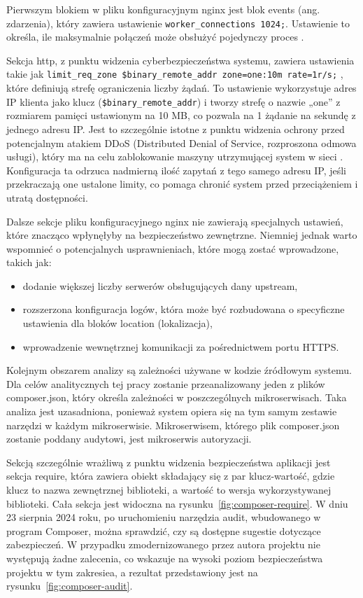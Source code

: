 \documentclass[12pt,oneside]{book}
\begin{document}
    Pierwszym blokiem w pliku konfiguracyjnym nginx jest blok events (ang. zdarzenia), który zawiera ustawienie \texttt{worker\_connections 1024;}. Ustawienie to określa, ile maksymalnie połączeń może obsłużyć pojedynczy proces \cite{nginx.worker.processes}.

    Sekcja http, z punktu widzenia cyberbezpieczeństwa systemu, zawiera ustawienia takie jak \texttt{limit\_req\_zone \$binary\_remote\_addr zone=one:10m rate=1r/s;} \cite{nginx.limit.req.zone}, które definiują strefę ograniczenia liczby żądań. To ustawienie wykorzystuje adres IP klienta jako klucz (\texttt{\$binary\_remote\_addr}) i tworzy strefę o nazwie „one” z rozmiarem pamięci ustawionym na 10 MB, co pozwala na 1 żądanie na sekundę z jednego adresu IP. Jest to szczególnie istotne z punktu widzenia ochrony przed potencjalnym atakiem DDoS (Distributed Denial of Service, rozproszona odmowa usługi), który ma na celu zablokowanie maszyny utrzymującej system w sieci \cite{cisa.ddos}. Konfiguracja ta odrzuca nadmierną ilość zapytań z tego samego adresu IP, jeśli przekraczają one ustalone limity, co pomaga chronić system przed przeciążeniem i utratą dostępności.

    Dalsze sekcje pliku konfiguracyjnego nginx nie zawierają specjalnych ustawień, które znacząco wpłynęłyby na bezpieczeństwo zewnętrzne. Niemniej jednak warto wspomnieć o potencjalnych usprawnieniach, które mogą zostać wprowadzone, takich jak:

    \begin{itemize}
        \item dodanie większej liczby serwerów obsługujących dany upstream,
        \item rozszerzona konfiguracja logów, która może być rozbudowana o specyficzne ustawienia dla bloków location (lokalizacja),
        \item wprowadzenie wewnętrznej komunikacji za pośrednictwem portu HTTPS.
    \end{itemize}

    Kolejnym obszarem analizy są zależności używane w kodzie źródłowym systemu. Dla celów analitycznych tej pracy zostanie przeanalizowany jeden z plików composer.json, który określa zależności w poszczególnych mikroserwisach. Taka analiza jest uzasadniona, ponieważ system opiera się na tym samym zestawie narzędzi w każdym mikroserwisie. Mikroserwisem, którego plik composer.json zostanie poddany audytowi, jest mikroserwis autoryzacji.

    Sekcją szczególnie wrażliwą z punktu widzenia bezpieczeństwa aplikacji jest sekcja require, która zawiera obiekt składający się z par klucz-wartość, gdzie klucz to nazwa zewnętrznej biblioteki, a wartość to wersja wykorzystywanej biblioteki. Cała sekcja jest widoczna na rysunku~\ref{fig:composer-require}. W dniu 23 sierpnia 2024 roku, po uruchomieniu narzędzia audit, wbudowanego w program Composer, można sprawdzić, czy są dostępne sugestie dotyczące zabezpieczeń. W przypadku zmodernizowanego przez autora projektu nie występują żadne zalecenia, co wskazuje na wysoki poziom bezpieczeństwa projektu w tym zakresiea, a rezultat przedstawiony jest na rysunku~\ref{fig:composer-audit}.
\end{document}
